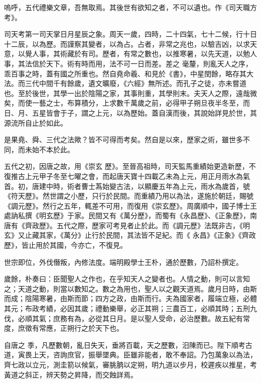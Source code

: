 
\begin{pinyinscope}

 嗚呼，五代禮樂文章，吾無取焉。其後世有欲知之者，不可以遺也。作《司天職方考》。



 司天考第一司天掌日月星辰之象。周天一歲，四時，二十四氣，七十二候，行十日十二辰，以為歷。而謹察其變者，以為占。占者，非常之兆也，以驗吉凶，以求天意，以覺人事，其術藏於有司。歷者，有常之數也，以推寒暑，以先天道，以勉人事，其法信於天下。術有時而用，法不可一日而差。差之
 毫釐，則亂天人之序，乖百事之時，蓋有國之所重也。然自堯命羲、和見於《書》，中星閏餘，略存其大法。而三代中間千有餘歲，遺文曠廢，《六經》無所述。而孔子之徒，亦未嘗道也。至於後世，其學一出於陰陽之家，其事則重，其學則末。夫天人之際，遠哉微矣，而使一藝之士，布算積分，上求數千萬歲之前，必得甲子朔旦夜半冬至，而日、月、五星皆會于子，謂之上元，以為歷始。蓋自漢而後，其說始詳見於世，其源流所自止於如此。



 是果堯、舜、三代之法歟？皆不可得而考矣。然自是以來，歷家之術，雖世多不同，而未始不本於此。



 五代之初，因唐之故，用《崇玄
 歷》。至晉高祖時，司天監馬重績始更造新歷，不復推古上元甲子冬至七曜之會，而起唐天寶十四載乙未為上元，用正月雨水為氣首。初，唐建中時，術者曹士蒍始變古法，以顯慶五年為上元，雨水為歲首，號《符天歷》。然世謂之小歷，只行於民間。而重績乃用以為法，遂施於朝廷，賜號《調元歷》。然行之五年，輒差不可用，而復用《崇玄歷》。周廣順中，國子博士王處訥私撰《明玄歷》于家。民間又有《萬分歷》，而蜀有《永昌歷》、《正象歷》，南唐有《齊政歷》。五代之際，歷家可考見者止於此。而《調元歷》法既非古，《明玄》又止藏其家，《萬分》止行於民間，其法皆不足紀。而《
 永昌》《正象》《齊政歷》，皆止用於其國，今亦亡，不復見。



 世宗即位，外伐僭叛，內修法度。端明殿學士王朴，通於歷數，乃詔朴撰定。



 歲餘，朴奏曰：臣聞聖人之作也，在乎知天人之變者也。人情之動，則可以言知之；天道之動，則當以數知之。數之為用也，聖人以之觀天道焉。歲月日時，由斯而成；陰陽寒暑，由斯而節；四方之政，由斯而行。夫為國家者，履端立極，必體其元；布政考績，必因其歲；禮動樂舉，必正其朔；三農百工，必順其時；五刑九伐，必順其氣；庶務有為，必從其日月。是以聖人受命，必治歷數。故五紀有常度，庶徵有常應，正朔行之於天下也。



 自唐之
 季，凡歷數朝，亂日失天，垂將百載，天之歷數，汨陳而已。陛下順考古道，寅畏上天，咨詢庶官，振舉墜典。臣雖非能者，敢不奉詔。乃包萬象以為法，齊七政以立元，測圭箭以候氣，審朓朒以定朔，明九道以步月，校遲疾以推星，考黃道之斜正，辨天勢之昇降，而交蝕詳焉。




\end{pinyinscope}
